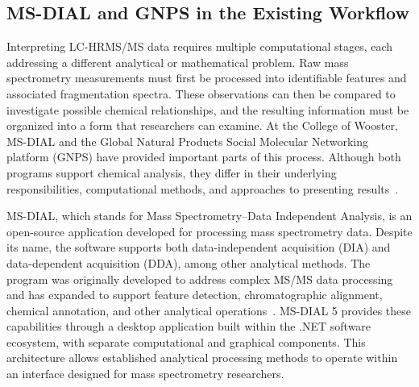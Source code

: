     \subsection{MS-DIAL and GNPS in the Existing Workflow}\label{subsec:msdial-gnps}


       Interpreting LC-HRMS/MS data requires multiple computational stages, each addressing a different analytical or mathematical problem. Raw mass spectrometry measurements must first be processed into identifiable features and associated fragmentation spectra. These observations can then be compared to investigate possible chemical relationships, and the resulting information must be organized into a form that researchers can examine. At the College of Wooster, MS-DIAL and the Global Natural Products Social Molecular Networking platform (GNPS) have provided important parts of this process. Although both programs support chemical analysis, they differ in their underlying responsibilities, computational methods, and approaches to presenting results~\cite{Tsugawa2015,Wang2016,Nothias2020}.

        MS-DIAL, which stands for Mass Spectrometry--Data Independent Analysis, is an open-source application developed for processing mass spectrometry data. Despite its name, the software supports both data-independent acquisition (DIA) and data-dependent acquisition (DDA), among other analytical methods. The program was originally developed to address complex MS/MS data processing and has expanded to support feature detection, chromatographic alignment, chemical annotation, and other analytical operations~\cite{Tsugawa2015,Tsugawa2018,Tsugawa2020}. MS-DIAL 5 provides these capabilities through a desktop application built within the .NET software ecosystem, with separate computational and graphical components. This architecture allows established analytical processing methods to operate within an interface designed for mass spectrometry researchers.

